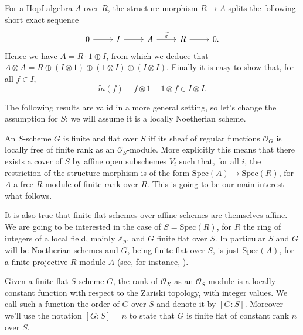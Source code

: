 \documentclass[../Main]{subfiles}
\begin{document}
\begin{defn}
	For a Hopf algebra $A$ over $R$,
	the structure morphism $R \to A$
	splits the following short exact sequence
	\begin{equation*}
	\begin{tikzcd}
		0 \arrow[r, "", rightarrow] &
		I \arrow[r, "", rightarrow] &
		A \arrow[r, "\widetilde{\varepsilon}", rightarrow] &
		R \arrow[r, "", rightarrow] &
		0.
	\end{tikzcd}
	\end{equation*}
	Hence we have $A = R \cdot 1 \oplus I$,
	from which we deduce that $A \otimes A = R \oplus \left( I \otimes 1 \right) \oplus
	\left( 1 \otimes I \right) \oplus \left( I \otimes I \right)$.
	Finally it is easy to show that, for all $f \in I$,
	\begin{equation*}
		\widetilde{m}(f) - f \otimes 1 - 1 \otimes f \in I \otimes I
	.\end{equation*} 
\end{defn}


The following results are valid in a more general setting, so let's change
the assumption for $S$: we will assume it is a locally Noetherian scheme.
\begin{rem}\label{rem:finiteGSMotivation}
	An $S$-scheme $G$ is finite and flat over $S$ iff its sheaf of regular functions
	$\mathcal{O}_G$ is locally free of finite rank as an $\mathcal{O}_S$-module.
	More explicitly this means that there exists a cover of $S$ by affine open subschemes
	$V_i$ such that, for all $i$, the restriction of the structure morphism is of the form
	$\mathrm{Spec}(A) \to \mathrm{Spec}(R)$, for $A$ a free $R$-module of finite rank over $R$. 
	This is going to be our main interest what follows.

	It is also true that finite flat schemes over affine schemes
	are themselves affine. 
	We are going to be interested in the case of $S = \mathrm{Spec}(R)$,
	for $R$ the ring of integers of a local field, mainly $\mathbb{Z}_p$,
	and $G$ finite flat over $S$.
	In particular $S$ and $G$ will be Noetherian schemes
	and $G$, being finite flat over $S$, is just $\mathrm{Spec}(A)$,
	for a finite projective $R$-module $A$ (see, for instance, 
	\cite[\href{https://stacks.math.columbia.edu/tag/00NX}{Lemma 00NX}]{SP}).
\end{rem}


\begin{defn}
	Given a finite flat $S$-scheme $G$, the rank of $\mathcal{O}_X$ as
	an $\mathcal{O}_S$-module is a locally constant function with respect
	to the Zariski topology, with integer values.
	We call such a function the order of $G$ over $S$ and denote it by $[G:S]$.
	Moreover we'll use the notation $[G:S] = n$ to state that $G$ is finite flat of
	constant rank $n$ over $S$.
\end{defn}
\end{document}
